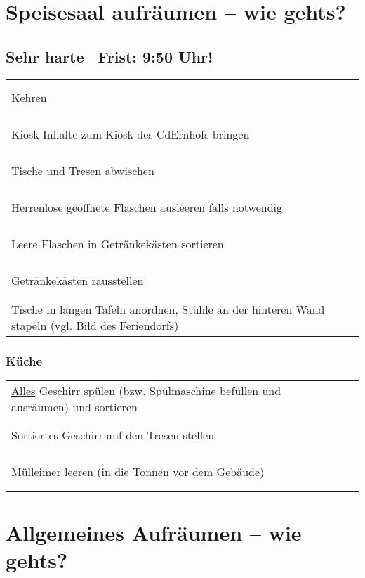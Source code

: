 \documentclass[14pt,parskip=full+]{scrartcl}
\newcommand{\checkfield}{~ \hfill ~\raisebox{-5pt}{\tikz\node[draw,minimum width=16.8pt,minimum height=16.8pt]{};}}
\newcommand{\mysection}[1]{\vspace{-.7\baselineskip}\subsubsection*{#1} \vspace{-.7\baselineskip}}
\begin{document}
\parbox[t]{.8\textwidth}{\vskip0pt
\section*{Speisesaal aufräumen -- wie gehts?}
\subsection*{Sehr harte\footnotemark~ Frist: 9:50 Uhr!}
}

\bigskip

\def\arraystretch{1.3}

\begin{tabularx}{\textwidth}{Xc}
 Kehren & \checkfield \\
 Kiosk-Inhalte zum Kiosk des CdErnhofs bringen & \checkfield \\
 Tische und Tresen abwischen & \checkfield \\
 Herrenlose geöffnete Flaschen ausleeren falls notwendig & \checkfield \\
 Leere Flaschen in Getränkekästen sortieren & \checkfield \\
 Getränkekästen rausstellen & \checkfield \\
 Tische in langen Tafeln anordnen, Stühle an der hinteren Wand stapeln (vgl. Bild des Feriendorfs)& \checkfield
\end{tabularx}
\mysection{Küche}
\begin{tabularx}{\textwidth}{Xc}
 \uline{Alles} Geschirr spülen (bzw. Spülmaschine befüllen und ausräumen) und sortieren & \checkfield \\ 
 Sortiertes Geschirr auf den Tresen stellen & \checkfield \\
 Mülleimer leeren (in die Tonnen vor dem Gebäude) & \checkfield \\
\end{tabularx}




\vspace{2cm}




\parbox[t]{.8\textwidth}{\vskip0pt
\section*{Allgemeines Aufräumen -- wie gehts?}
}
\parbox[t]{.2\textwidth}{\vskip0pt 
}
\end{document}
